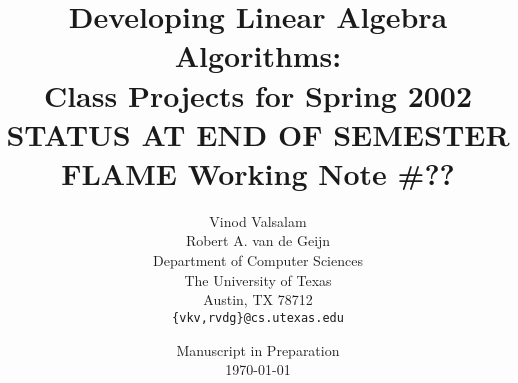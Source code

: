 
\pagestyle{plain}  %

\title{
Developing 
Linear Algebra Algorithms: \\
Class Projects for Spring 2002\\[0.15in]
{\bf \large STATUS AT END OF SEMESTER} \\[0.15in]
\large FLAME Working Note \#??
}

\author{
Vinod Valsalam \\[0.05in]
Robert A. van de Geijn 
\\[0.25in]
Department of Computer Sciences\\
The University of Texas\\
Austin, TX 78712\\
{ \tt \{vkv,rvdg\}@cs.utexas.edu}
}

\date{
Manuscript in Preparation \\
\today
}



\maketitle

\

\newpage

\begin{abstract}

\end{abstract}

\

\newpage

\tableofcontents
%


\pagestyle{plain}

